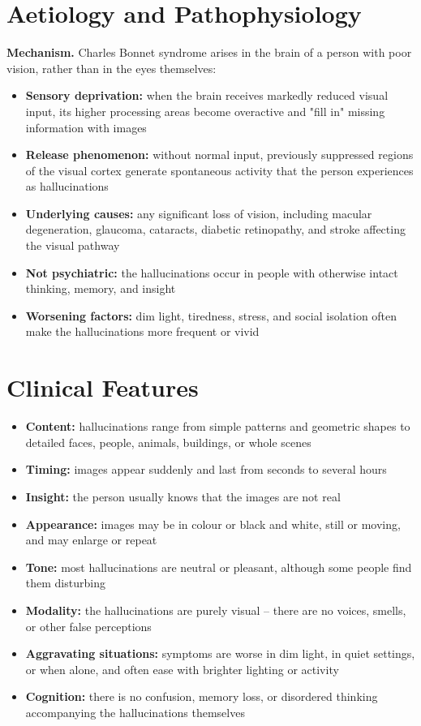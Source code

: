 \section*{Aetiology and Pathophysiology}
\medskip
\textbf{Mechanism.} Charles Bonnet syndrome arises in the brain of a person with poor vision, rather than in the eyes themselves:
\begin{itemize}
    \item \textbf{Sensory deprivation:} when the brain receives markedly reduced visual input, its higher processing areas become overactive and "fill in" missing information with images
    \item \textbf{Release phenomenon:} without normal input, previously suppressed regions of the visual cortex generate spontaneous activity that the person experiences as hallucinations
    \item \textbf{Underlying causes:} any significant loss of vision, including macular degeneration, glaucoma, cataracts, diabetic retinopathy, and stroke affecting the visual pathway
    \item \textbf{Not psychiatric:} the hallucinations occur in people with otherwise intact thinking, memory, and insight
    \item \textbf{Worsening factors:} dim light, tiredness, stress, and social isolation often make the hallucinations more frequent or vivid
\end{itemize}

\section*{Clinical Features}
\begin{itemize}
    \item \textbf{Content:} hallucinations range from simple patterns and geometric shapes to detailed faces, people, animals, buildings, or whole scenes
    \item \textbf{Timing:} images appear suddenly and last from seconds to several hours
    \item \textbf{Insight:} the person usually knows that the images are not real
    \item \textbf{Appearance:} images may be in colour or black and white, still or moving, and may enlarge or repeat
    \item \textbf{Tone:} most hallucinations are neutral or pleasant, although some people find them disturbing
    \item \textbf{Modality:} the hallucinations are purely visual -- there are no voices, smells, or other false perceptions
    \item \textbf{Aggravating situations:} symptoms are worse in dim light, in quiet settings, or when alone, and often ease with brighter lighting or activity
    \item \textbf{Cognition:} there is no confusion, memory loss, or disordered thinking accompanying the hallucinations themselves
\end{itemize}

